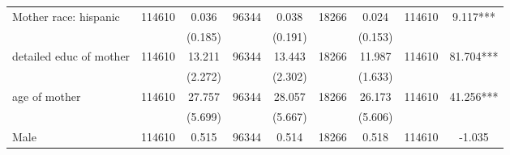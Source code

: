 \begin{tabular}{@{\extracolsep{5pt}}lcccccccc}
Mother race: hispanic   & 114610    & 0.036    & 96344    & 0.038    & 18266    & 0.024    & 114610    & 9.117***   \\                                                                                                                                                                                                                                         
 &   & (0.185)  &   & (0.191)  &   & (0.153)  &   &  \\ [1ex]                                                                                                                                                                                                                                                                                                  
detailed educ of mother   & 114610    & 13.211    & 96344    & 13.443    & 18266    & 11.987    & 114610    & 81.704***   \\                                                                                                                                                                                                                                   
 &   & (2.272)  &   & (2.302)  &   & (1.633)  &   &  \\ [1ex]                                                                                                                                                                                                                                                                                                  
age of mother   & 114610    & 27.757    & 96344    & 28.057    & 18266    & 26.173    & 114610    & 41.256***   \\                                                                                                                                                                                                                                             
 &   & (5.699)  &   & (5.667)  &   & (5.606)  &   &  \\ [1ex]                                                                                                                                                                                                                                                                                                  
Male   & 114610    & 0.515    & 96344    & 0.514    & 18266    & 0.518    & 114610    & -1.035   \\                                                                                                                                                                                                                                                            

\end{tabular}
